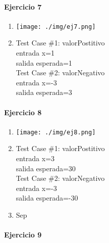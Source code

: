 \documentclass{article}
\begin{document}
\paragraph{Ejercicio 7}

\begin{multicols}{2}
\begin{enumerate}
\item \texttt{[image: ./img/ej7.png]}
\item	
Test Case \#1: valorPostitivo\\
\hspace*{6mm}entrada x=1\\
\hspace*{6mm}salida esperada=1\medskip\\
Test Case \#2: valorNegativo\\
\hspace*{6mm}entrada x=-3\\
\hspace*{6mm}salida esperada=3\medskip\\
\end{enumerate}
\end{multicols}

\paragraph{Ejercicio 8}

\begin{multicols}{2}
\begin{enumerate}
\item \texttt{[image: ./img/ej8.png]}
\item	
Test Case \#1: valorPostitivo\\
\hspace*{6mm}entrada x=3\\
\hspace*{6mm}salida esperada=30\medskip\\
Test Case \#2: valorNegativo\\
\hspace*{6mm}entrada x=-3\\
\hspace*{6mm}salida esperada=-30\medskip\\
\item Sep
\end{enumerate}
\end{multicols}

\paragraph{Ejercicio 9}
\end{document}
